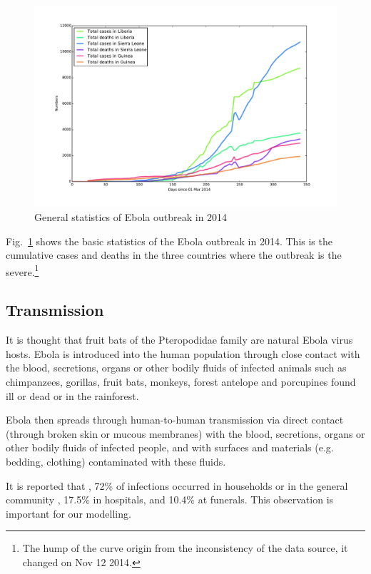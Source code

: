 \documentclass[12pt]{article}
\begin{document}
\begin{figure}[hbt]
\begin{center}
  \includegraphics[width=6in]{graph/bstats.pdf}
  \caption{General statistics of Ebola outbreak in 2014}
  \label{stats}
\end{center}  
\end{figure}

Fig.~\ref{stats} shows the basic statistics of the Ebola outbreak in 2014. This is the cumulative cases and deaths in the three countries where the outbreak is the severe.\footnote{The hump of the curve origin from the inconsistency of the data source, it changed on Nov 12 2014.}



\subsection{Transmission}

It is thought that fruit bats of the Pteropodidae family are natural Ebola virus hosts. Ebola is introduced into the human population through close contact with the blood, secretions, organs or other bodily fluids of infected animals such as chimpanzees, gorillas, fruit bats, monkeys, forest antelope and porcupines found ill or dead or in the rainforest.


Ebola then spreads through human-to-human transmission via direct contact (through broken skin or mucous membranes) with the blood, secretions, organs or other bodily fluids of infected people, and with surfaces and materials (e.g. bedding, clothing) contaminated with these fluids.

It is reported that \cite{merler2015spatiotemporal}, 72\%  of infections occurred in households or in the general community , 17.5\% in hospitals, and 10.4\% at funerals. This observation is important for our modelling.
\end{document}
